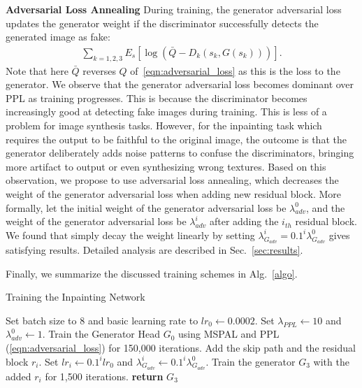 \noindent\textbf{Adversarial Loss Annealing} During training, the generator adversarial loss updates the generator weight if the discriminator successfully detects the generated image as fake:
\begin{eqnarray}
\sum\limits_{k=1,2,3}E_s[\log (\bar{Q}-D_k(s_k,G(s_k)))].
\end{eqnarray}
Note that here $\bar{Q}$ reverses $Q$ of~\ref{eqn:adversarial_loss} as this is the loss to the generator. We observe that the generator adversarial loss becomes dominant over PPL as training progresses. This is because the discriminator becomes increasingly good at detecting fake images during training. This is less of a problem for image synthesis tasks. However, for the inpainting task which requires the output to be faithful to the original image, the outcome is that the generator deliberately adds noise patterns to confuse the discriminators, bringing more artifact to output or even synthesizing wrong textures. Based on this observation, we propose to use adversarial loss annealing, which decreases the weight of the generator adversarial loss when adding new residual block. More formally, let the initial weight of the generator adversarial loss be $\lambda^0_{adv}$, and the weight of the generator adversarial loss be $\lambda^i_{adv}$ after adding the $i_{th}$ residual block. We found that simply decay the weight linearly by setting $\lambda^i_{G_{adv}}=0.1^i\lambda^0_{G_{adv}}$ gives satisfying results. Detailed analysis are described in Sec.~\ref{sec:results}.

Finally, we summarize the discussed training schemes in Alg.~\ref{algo}.
\begin{algorithm}
\caption{Training the Inpainting Network}\label{algo}
\begin{algorithmic}[1]
\State Set batch size to 8 and basic learning rate to $lr_0\gets 0.0002$.
\State Set $\lambda_{PPL}\gets 10$ and $\lambda^0_{{adv}}\gets 1$.
\State Train the Generator Head $G_0$ using MSPAL and PPL (\ref{eqn:adversarial_loss}) for 150,000 iterations.
\State Add the skip path and the residual block $r_i$.
\State Set $lr_i\gets 0.1^i lr_0$ and $\lambda^i_{G_{adv}}\gets 0.1^i\lambda^0_{G_{adv}}$.
\State Train the generator $G_3$ with the added $r_i$ for 1,500 iterations.
\EndFor
\State \textbf{return} $G_3$ 
\end{algorithmic}
\end{algorithm}
